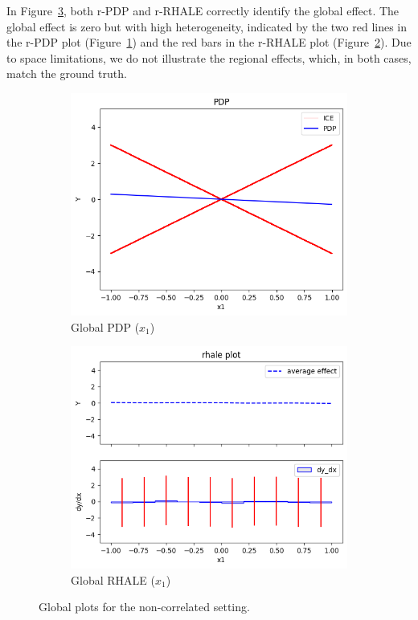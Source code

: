 \documentclass[
twocolumn,
]{ceurart}
\begin{document}
In Figure~\ref{fig:synthetic-1-uncorrelated}, both r-PDP and r-RHALE correctly identify the global effect. The global effect is zero but with high heterogeneity, indicated by the two red lines in the r-PDP plot (Figure~\ref{subfig:global_pdp}) and the red bars in the r-RHALE plot (Figure~\ref{subfig:global_rhale}). Due to space limitations, we do not illustrate the regional effects, which, in both cases, match the ground truth.

\begin{figure}
    \centering
    \begin{subfigure}[b]{0.24\textwidth}
        \centering
        \includegraphics[width=\textwidth]{figures/simulation_1/uncor_global_pdp.png}
        \caption{Global PDP ($x_1$)}
        \label{subfig:global_pdp}
    \end{subfigure}
    \begin{subfigure}[b]{0.24\textwidth}
        \centering
        \includegraphics[width=\textwidth]{figures/simulation_1/uncor_global_rhale.png}
        \caption{Global RHALE ($x_1$)}
        \label{subfig:global_rhale}
    \end{subfigure}
    \caption{Global plots for the non-correlated setting.}
    \label{fig:synthetic-1-uncorrelated}
  \end{figure}
\end{document}
